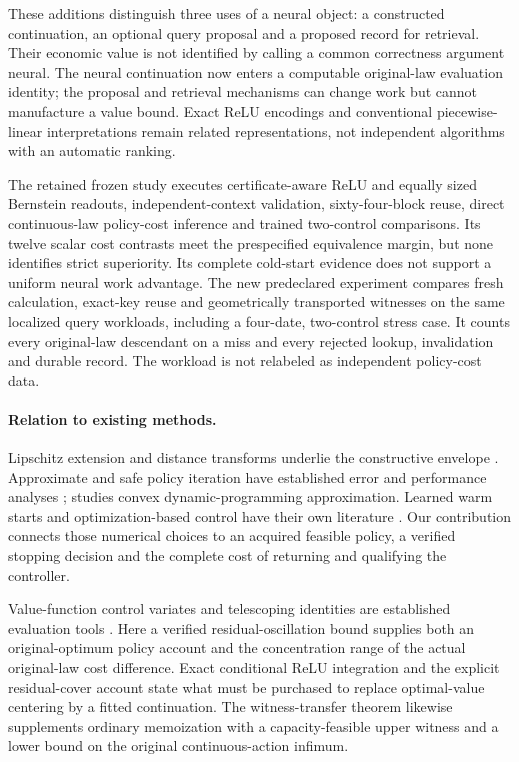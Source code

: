 \documentclass[ecta,nameyear,draft]{econsocart}
\begin{document}
These additions distinguish three uses of a neural object: a constructed continuation, an optional query proposal and a proposed record for retrieval. Their economic value is not identified by calling a common correctness argument neural. The neural continuation now enters a computable original-law evaluation identity; the proposal and retrieval mechanisms can change work but cannot manufacture a value bound. Exact ReLU encodings and conventional piecewise-linear interpretations remain related representations, not independent algorithms with an automatic ranking.

The retained frozen study executes certificate-aware ReLU and equally sized Bernstein readouts, independent-context validation, sixty-four-block reuse, direct continuous-law policy-cost inference and trained two-control comparisons. Its twelve scalar cost contrasts meet the prespecified equivalence margin, but none identifies strict superiority. Its complete cold-start evidence does not support a uniform neural work advantage. The new predeclared experiment compares fresh calculation, exact-key reuse and geometrically transported witnesses on the same localized query workloads, including a four-date, two-control stress case. It counts every original-law descendant on a miss and every rejected lookup, invalidation and durable record. The workload is not relabeled as independent policy-cost data.

\paragraph{Relation to existing methods.}
Lipschitz extension and distance transforms underlie the constructive envelope \citep{mcshane1934,felzenszwalb2012}. Approximate and safe policy iteration have established error and performance analyses \citep{munos2003,pirotta2013,scherrer2015}; \citet{yang2020convex} studies convex dynamic-programming approximation. Learned warm starts and optimization-based control have their own literature \citep{sakaue2023warm,sambharya2023,agrawal2020control}. Our contribution connects those numerical choices to an acquired feasible policy, a verified stopping decision and the complete cost of returning and qualifying the controller.

Value-function control variates and telescoping identities are established evaluation tools \citep{munos2006variance,jiang2016}. Here a verified residual-oscillation bound supplies both an original-optimum policy account and the concentration range of the actual original-law cost difference. Exact conditional ReLU integration and the explicit residual-cover account state what must be purchased to replace optimal-value centering by a fitted continuation. The witness-transfer theorem likewise supplements ordinary memoization with a capacity-feasible upper witness and a lower bound on the original continuous-action infimum.
\end{document}
